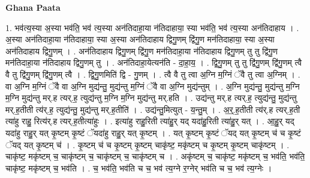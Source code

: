 \documentclass[17pt]{extarticle}
\begin{document}
\textbf{Ghana Paata } \newline

1. भव॑त्य॒स्या अ॒स्या भव॑ति॒ भव॑ त्य॒स्या अन॑तिदाहा॒या न॑तिदाहाया॒ स्या भव॑ति॒ भव॑ त्य॒स्या अन॑तिदाहाय । . अ॒स्या अन॑तिदाहा॒या न॑तिदाहाया॒ स्या अ॒स्या अन॑तिदाहाय द्विगु॒णम् द्वि॑गु॒ण मन॑तिदाहाया॒ स्या अ॒स्या अन॑तिदाहाय द्विगु॒णम् । . अन॑तिदाहाय द्विगु॒णम् द्वि॑गु॒ण मन॑तिदाहा॒या न॑तिदाहाय द्विगु॒णम् तु तु द्वि॑गु॒ण मन॑तिदाहा॒या न॑तिदाहाय द्विगु॒णम् तु । . अन॑तिदाहा॒येत्यन॑ति - दा॒हा॒य॒ । . द्वि॒गु॒णम् तु तु द्वि॑गु॒णम् द्वि॑गु॒णम् त्वै वै तु द्वि॑गु॒णम् द्वि॑गु॒णम् त्वै । . द्वि॒गु॒णमिति॑ द्वि - गु॒णम् । . त्वै वै तु त्वा अ॒ग्नि म॒ग्निं ॅवै तु त्वा अ॒ग्निम् । . वा अ॒ग्नि म॒ग्निं ॅवै वा अ॒ग्नि मुद्य॑न्तु॒ मुद्य॑न्तु म॒ग्निं ॅवै वा अ॒ग्नि मुद्य॑न्तुम् । . अ॒ग्नि मुद्य॑न्तु॒ मुद्य॑न्तु म॒ग्नि म॒ग्नि मुद्य॑न्तु मर्.ह त्यर्.ह॒ त्युद्य॑न्तु म॒ग्नि म॒ग्नि मुद्य॑न्तु मर्.हति । . उद्य॑न्तु मर्.ह त्यर्.ह॒ त्युद्य॑न्तु॒ मुद्य॑न्तु मर्.ह॒तीती त्य॑र्.ह॒ त्युद्य॑न्तु॒ मुद्य॑न्तु मर्.ह॒तीति॑ । . उद्य॑न्तु॒मित्युत् - य॒न्तु॒म् । . अ॒र्॒.ह॒तीती त्य॑र्.ह त्यर्.ह॒ती त्या॑हु राहु॒ रित्य॑र्.ह त्यर्.ह॒तीत्या॑हुः । . इत्या॑हु राहु॒रिती त्या॑हु॒र् यद् यदा॑हु॒रिती त्या॑हु॒र् यत् । . आ॒हु॒र् यद् यदा॑हु राहु॒र् यत् कृ॒ष्टम् कृ॒ष्टं ॅयदा॑हु राहु॒र् यत् कृ॒ष्टम् । . यत् कृ॒ष्टम् कृ॒ष्टं ॅयद् यत् कृ॒ष्टम् च॑ च कृ॒ष्टं ॅयद् यत् कृ॒ष्टम् च॑ । . कृ॒ष्टम् च॑ च कृ॒ष्टम् कृ॒ष्टम् चाकृ॑ष्ट॒ मकृ॑ष्टम् च कृ॒ष्टम् कृ॒ष्टम् चाकृ॑ष्टम् । . चाकृ॑ष्ट॒ मकृ॑ष्टम् च॒ चाकृ॑ष्टम् च॒ चाकृ॑ष्टम् च॒ चाकृ॑ष्टम् च । . अकृ॑ष्टम् च॒ चाकृ॑ष्ट॒ मकृ॑ष्टम् च॒ भव॑ति॒ भव॑ति॒ चाकृ॑ष्ट॒ मकृ॑ष्टम् च॒ भव॑ति । . च॒ भव॑ति॒ भव॑ति च च॒ भव॑ त्य॒ग्ने र॒ग्नेर् भव॑ति च च॒ भव॑ त्य॒ग्नेः । \newline
\end{document}
